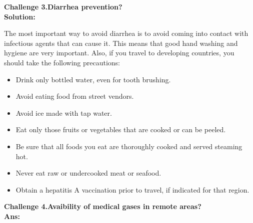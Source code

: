 \documentclass[12]{article}
\begin{document}
		 	\begin{flushleft}
		 		\textbf{Challenge 3.Diarrhea prevention?}\\
		 		\textbf{Solution:}	
		 	\end{flushleft}
		 	The most important way to avoid diarrhea is to avoid coming into contact with infectious agents that can cause it. This means that good hand washing and hygiene are very important.
		 	Also, if you travel to developing countries, you should take the following precautions:
		 	\begin{itemize}
		 		\item Drink only bottled water, even for tooth brushing.
		 		\item Avoid eating food from street vendors.
		 		\item Avoid ice made with tap water.
		 		\item Eat only those fruits or vegetables that are cooked or can be peeled.
		 		\item Be sure that all foods you eat are thoroughly cooked and served steaming hot.
		 		\item Never eat raw or undercooked meat or seafood.
		 		\item Obtain a hepatitis A vaccination prior to travel, if indicated for that region.\\
		 	\end{itemize}
		 	\begin{flushleft}
		    \textbf{Challenge 4.Avaibility of medical gases in remote areas?}\\
		 	\textbf{Ans:}	
		 	\end{flushleft}
\end{document}
